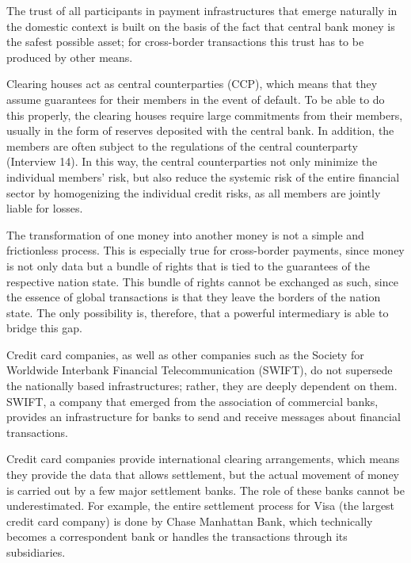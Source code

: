 \documentclass[
]{book}
\begin{document}
The trust of all participants in payment infrastructures that emerge naturally in the domestic context is built on the basis of the fact that central bank money is the safest possible asset; for cross-border transactions this trust has to be produced by other means.

Clearing houses act as central counterparties (CCP), which means that they assume guarantees for their members in the event of default. To be able to do this properly, the clearing houses require large commitments from their members, usually in the form of reserves deposited with the central bank. In addition, the members are often subject to the regulations of the central counterparty (Interview 14). In this way, the central counterparties not only minimize the individual members' risk, but also reduce the systemic risk of the entire financial sector by homogenizing the individual credit risks, as all members are jointly liable for losses.

The transformation of one money into another money is not a simple and frictionless process. This is especially true for cross-border payments, since money is not only data but a bundle of rights that is tied to the guarantees of the respective nation state. This bundle of rights cannot be exchanged as such, since the essence of global transactions is that they leave the borders of the nation state. The only possibility is, therefore, that a powerful intermediary is able to bridge this gap.

Credit card companies, as well as other companies such as the Society for Worldwide Interbank Financial Telecommunication (SWIFT), do not supersede the nationally based infrastructures; rather, they are deeply dependent on them. SWIFT, a company that emerged from the association of commercial banks, provides an infrastructure for banks to send and receive messages about financial transactions.

Credit card companies provide international clearing arrangements, which means they provide the data that allows settlement, but the actual movement of money is carried out by a few major settlement banks. The role of these banks cannot be underestimated. For example, the entire settlement process for Visa (the largest credit card company) is done by Chase Manhattan Bank, which technically becomes a correspondent bank or handles the transactions through its subsidiaries.
\end{document}
